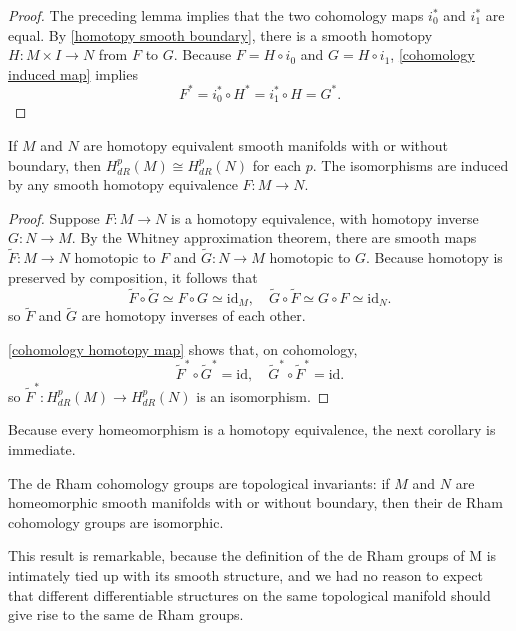 \begin{proof}
The preceding lemma implies that the two cohomology maps $i_0^*$ and $i_1^*$ are equal. By \cref{homotopy smooth boundary}, there is a smooth homotopy $H:M\times I\to N$ from $F$ to $G$. Because $F=H\circ i_0$ and $G=H\circ i_1$, \cref{cohomology induced map} implies
\[F^*=i_0^*\circ H^*=i_1^*\circ H=G^*.\]
\end{proof}
\begin{theorem}
If $M$ and $N$ are homotopy equivalent smooth manifolds with or without boundary, then $H^p_{dR}(M)\cong H^p_{dR}(N)$ for each $p$. The isomorphisms are induced by any smooth homotopy equivalence $F:M\to N$.
\end{theorem}
\begin{proof}
Suppose $F:M\to N$ is a homotopy equivalence, with homotopy inverse $G:N\to M$. By the Whitney approximation theorem, there are smooth maps $\widetilde{F}:M\to N$ homotopic to $F$ and $\widetilde{G}:N\to M$ homotopic to $G$. Because homotopy is preserved by composition, it follows that 
\[\widetilde{F}\circ\widetilde{G}\simeq F\circ G\simeq\mathrm{id}_M,\quad \widetilde{G}\circ\widetilde{F}\simeq G\circ F\simeq\mathrm{id}_N.\]
so $\widetilde{F}$ and $\widetilde{G}$ are homotopy inverses of each other.\par
\cref{cohomology homotopy map} shows that, on cohomology,
\[\widetilde{F}^*\circ\widetilde{G}^*=\mathrm{id},\quad \widetilde{G}^*\circ\widetilde{F}^*=\mathrm{id}.\]
so $\widetilde{F}^*:H^p_{dR}(M)\to H^p_{dR}(N)$ is an isomorphism.
\end{proof}
Because every homeomorphism is a homotopy equivalence, the next corollary is immediate.
\begin{corollary}
The de Rham cohomology groups are topological invariants: if $M$ and $N$ are homeomorphic smooth manifolds with or without boundary, then their de Rham cohomology
groups are isomorphic.
\end{corollary}
This result is remarkable, because the definition of the de Rham groups of M
is intimately tied up with its smooth structure, and we had no reason to expect that
different differentiable structures on the same topological manifold should give rise
to the same de Rham groups.
